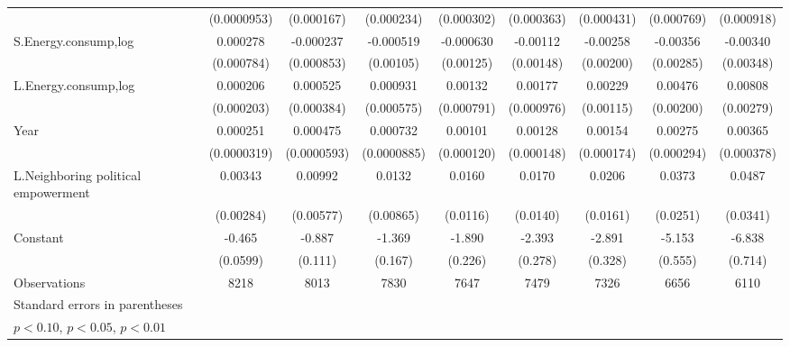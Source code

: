 \begin{table}[htbp]
\begin{tabular}{l*{8}{c}}
                    & (0.0000953)         &  (0.000167)         &  (0.000234)         &  (0.000302)         &  (0.000363)         &  (0.000431)         &  (0.000769)         &  (0.000918)         \\
[1em]
S.Energy.consump,log&    0.000278         &   -0.000237         &   -0.000519         &   -0.000630         &    -0.00112         &    -0.00258         &    -0.00356         &    -0.00340         \\
                    &  (0.000784)         &  (0.000853)         &   (0.00105)         &   (0.00125)         &   (0.00148)         &   (0.00200)         &   (0.00285)         &   (0.00348)         \\
[1em]
L.Energy.consump,log&    0.000206         &    0.000525         &    0.000931         &     0.00132\sym{*}  &     0.00177\sym{*}  &     0.00229\sym{**} &     0.00476\sym{**} &     0.00808\sym{***}\\
                    &  (0.000203)         &  (0.000384)         &  (0.000575)         &  (0.000791)         &  (0.000976)         &   (0.00115)         &   (0.00200)         &   (0.00279)         \\
[1em]
Year                &    0.000251\sym{***}&    0.000475\sym{***}&    0.000732\sym{***}&     0.00101\sym{***}&     0.00128\sym{***}&     0.00154\sym{***}&     0.00275\sym{***}&     0.00365\sym{***}\\
                    & (0.0000319)         & (0.0000593)         & (0.0000885)         &  (0.000120)         &  (0.000148)         &  (0.000174)         &  (0.000294)         &  (0.000378)         \\
[1em]
L.Neighboring political empowerment&     0.00343         &     0.00992\sym{*}  &      0.0132         &      0.0160         &      0.0170         &      0.0206         &      0.0373         &      0.0487         \\
                    &   (0.00284)         &   (0.00577)         &   (0.00865)         &    (0.0116)         &    (0.0140)         &    (0.0161)         &    (0.0251)         &    (0.0341)         \\
[1em]
Constant            &      -0.465\sym{***}&      -0.887\sym{***}&      -1.369\sym{***}&      -1.890\sym{***}&      -2.393\sym{***}&      -2.891\sym{***}&      -5.153\sym{***}&      -6.838\sym{***}\\
                    &    (0.0599)         &     (0.111)         &     (0.167)         &     (0.226)         &     (0.278)         &     (0.328)         &     (0.555)         &     (0.714)         \\
\hline
Observations        &        8218         &        8013         &        7830         &        7647         &        7479         &        7326         &        6656         &        6110         \\
\hline\hline
\multicolumn{9}{l}{\footnotesize Standard errors in parentheses}\\
\multicolumn{9}{l}{\footnotesize \sym{*} \(p<0.10\), \sym{**} \(p<0.05\), \sym{***} \(p<0.01\)}\\
\end{tabular}
\end{table}
